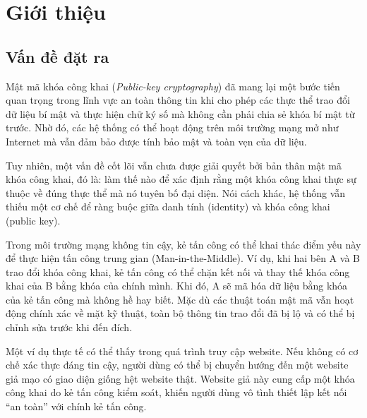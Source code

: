 \chapter{Giới thiệu}
\label{chap:intro}


\section{Vấn đề đặt ra}
\label{sec:1.1}

Mật mã khóa công khai (\textit{Public-key cryptography}) đã mang lại một bước tiến quan trọng trong lĩnh vực an toàn thông tin khi cho phép các thực thể trao đổi dữ liệu bí mật và thực hiện chữ ký số mà không cần phải chia sẻ khóa bí mật từ trước. Nhờ đó, các hệ thống có thể hoạt động trên môi trường mạng mở như Internet mà vẫn đảm bảo được tính bảo mật và toàn vẹn của dữ liệu.

Tuy nhiên, một vấn đề cốt lõi vẫn chưa được giải quyết bởi bản thân mật mã khóa công khai, đó là: làm thế nào để xác định rằng một khóa công khai thực sự thuộc về đúng thực thể mà nó tuyên bố đại diện. Nói cách khác, hệ thống vẫn thiếu một cơ chế để ràng buộc giữa danh tính (identity) và khóa công khai (public key).

Trong môi trường mạng không tin cậy, kẻ tấn công có thể khai thác điểm yếu này để thực hiện tấn công trung gian (Man-in-the-Middle). Ví dụ, khi hai bên A và B trao đổi khóa công khai, kẻ tấn công có thể chặn kết nối và thay thế khóa công khai của B bằng khóa của chính mình. Khi đó, A sẽ mã hóa dữ liệu bằng khóa của kẻ tấn công mà không hề hay biết. Mặc dù các thuật toán mật mã vẫn hoạt động chính xác về mặt kỹ thuật, toàn bộ thông tin trao đổi đã bị lộ và có thể bị chỉnh sửa trước khi đến đích.

Một ví dụ thực tế có thể thấy trong quá trình truy cập website. Nếu không có cơ chế xác thực đáng tin cậy, người dùng có thể bị chuyển hướng đến một website giả mạo có giao diện giống hệt website thật. Website giả này cung cấp một khóa công khai do kẻ tấn công kiểm soát, khiến người dùng vô tình thiết lập kết nối “an toàn” với chính kẻ tấn công.

